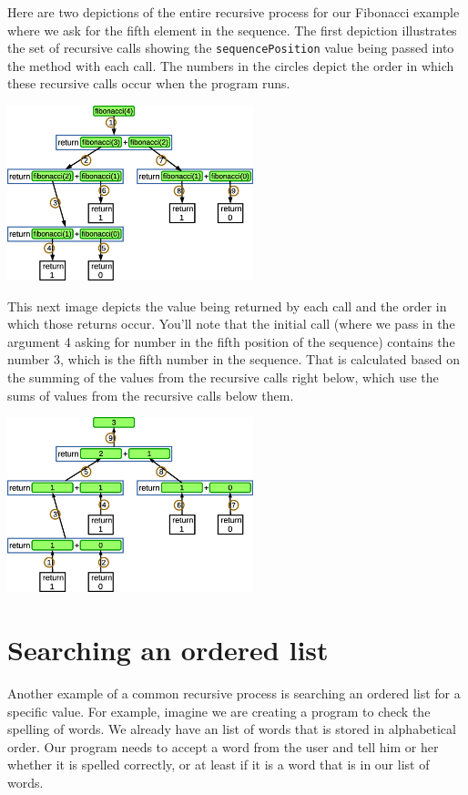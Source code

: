 \pagebreak

Here are two depictions of the entire recursive process for our Fibonacci example where we ask for the fifth element in the sequence. The first depiction illustrates the set of recursive calls showing the \texttt{sequencePosition} value being passed into the method with each call. The numbers in the circles depict the order in which these recursive calls occur when the program runs.

\beforefig
\centerline{\includegraphics[height=2in]{figs2/recursion-fibonacci-depiction-0.eps}}
\afterfig

This next image depicts the value being returned by each call and the order in which those returns occur. You'll note that the initial call (where we pass in the argument 4 asking for number in the fifth position of the sequence) contains the number 3, which is the fifth number in the sequence. That is calculated based on the summing of the values from the recursive calls right below, which use the sums of values from the recursive calls below them.

\beforefig
\centerline{\includegraphics[height=2in]{figs2/recursion-fibonacci-depiction-1.eps}}
\afterfig

\section{Searching an ordered list}

Another example of a common recursive process is searching an ordered list for a specific value. For example, imagine we are creating a program to check the spelling of words. We already have an list of words that is stored in alphabetical order. Our program needs to accept a word from the user and tell him or her whether it is spelled correctly, or at least if it is a word that is in our list of words.


